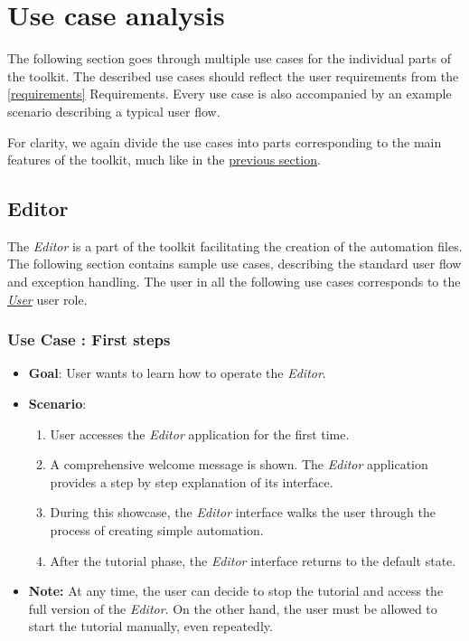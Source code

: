 \section{Use case analysis} \label{usecases}

The following section goes through multiple use cases for the individual parts of the toolkit.
The described use cases should reflect the user requirements from the \autoref{requirements} Requirements.
Every use case is also accompanied by an example scenario describing a typical user flow.

For clarity, we again divide the use cases into parts corresponding to the main features of the toolkit, 
much like in the \hyperref[requirements]{previous section}.

\subsection{Editor}

The \textit{Editor} is a part of the toolkit facilitating the creation of the automation files.
The following section contains sample use cases, describing the standard user flow and exception handling.
The user in all the following use cases corresponds to the \hyperref[UserUserRole]{\textit{User}} user role.

\setcounter{usecases}{1}

\def \usecase {Use Case }

\subsubsection*{\usecase: First steps}
\begin{itemize}
    \item \textbf{Goal}: User wants to learn how to operate the \textit{Editor}.
    \item \textbf{Scenario}: 
    \begin{enumerate}[label=\arabic*.]
        \item User accesses the \textit{Editor} application for the first time. 
        \item A comprehensive welcome message is shown.
        The \textit{Editor} application provides a step by step explanation of its interface.
        \item During this showcase, the \textit{Editor} interface walks the user through the process of creating simple automation.
        \item After the tutorial phase, the \textit{Editor} interface returns to the default state.
    \end{enumerate}
    \item \textbf{Note:} At any time, the user can decide to stop the tutorial and access the full version of the \textit{Editor}.
    On the other hand, the user must be allowed to start the tutorial manually, even repeatedly.
\end{itemize}

